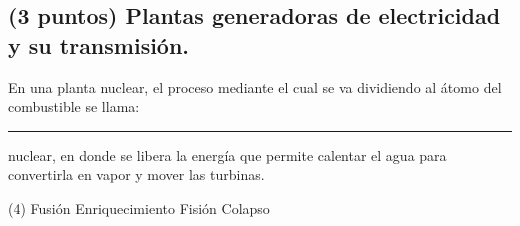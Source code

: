 \documentclass[12pt, letter]{exam}
\begin{document}
\begin{questions}
    \section{(3 puntos) Plantas generadoras de electricidad y su transmisión.}

    \question En una planta nuclear, el proceso mediante el cual se va dividiendo al átomo del combustible se llama: \rule{2cm}{0.1mm} nuclear, en donde se libera la energía que permite calentar el agua para convertirla en vapor y mover las turbinas.
    \begin{tasks}(4)
        \task Fusión
        \task Enriquecimiento
        \task Fisión
        \task Colapso
    \end{tasks}
    


\end{questions}
\end{document}
